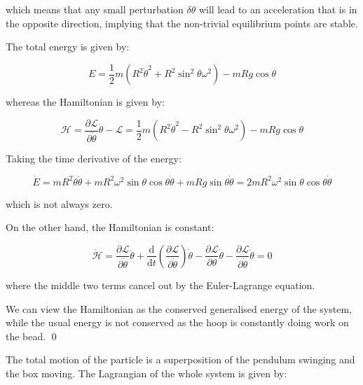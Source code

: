 \documentclass[12pt]{article}
\begin{document}
which means that any small perturbation $\delta \theta$ will lead to an acceleration that is in the opposite direction, implying that the non-trivial equilibrium points are stable.

The total energy is given by:

\begin{equation}
    E = \frac{1}{2} m (R^{2} \dot{\theta}^{2} + R^{2} \sin^{2}{\theta} \omega^{2}) - mRg \cos{\theta}
\end{equation}

whereas the Hamiltonian is given by:

\begin{equation}
    \mathcal{H} = \frac{\partial \mathcal{L}}{\partial \dot{\theta}} \dot{\theta} - \mathcal{L} = \frac{1}{2} m (R^{2} \dot{\theta}^{2} - R^{2} \sin^{2}{\theta} \omega^{2}) - mRg \cos{\theta}
\end{equation}

Taking the time derivative of the energy:

\begin{equation}
    \dot{E} = mR^{2} \dot{\theta} \ddot{\theta} + mR^{2} \omega^{2} \sin{\theta} \cos{\theta} \dot{\theta} + mRg \sin{\theta} \dot{\theta} = 2mR^{2} \omega^{2} \sin{\theta} \cos{\theta} \dot{\theta}
\end{equation}

which is not always zero.

On the other hand, the Hamiltonian is constant:

\begin{equation}
    \dot{\mathcal{H}} = \frac{\partial \mathcal{L}}{\partial \dot{\theta}} \ddot{\theta} + \frac{\mathrm{d}}{\mathrm{d}t} \left( \frac{\partial \mathcal{L}}{\partial \dot{\theta}} \right) \dot{\theta} - \frac{\partial \mathcal{L}}{\partial \theta} \dot{\theta} - \frac{\partial \mathcal{L}}{\partial \dot{\theta}} \ddot{\theta} = 0
\end{equation}

where the middle two terms cancel out by the Euler-Lagrange equation.

We can view the Hamiltonian as the conserved generalised energy of the system, while the usual energy is not conserved as the hoop is constantly doing work on the bead.
\qed



The total motion of the particle is a superposition of the pendulum swinging and the box moving. The Lagrangian of the whole system is given by:
\end{document}
